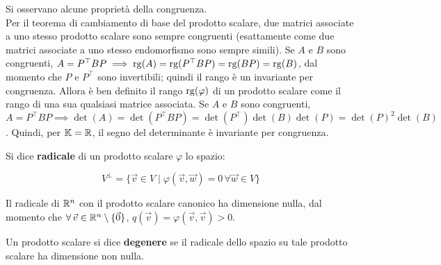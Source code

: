 \begin{remark}
	Si osservano alcune proprietà della congruenza. \\
	
	\li Per il teorema di cambiamento di base del prodotto scalare, due matrici associate a uno stesso
	prodotto scalare sono sempre congruenti (esattamente come due matrici associate a uno stesso
	endomorfismo sono sempre simili).
	\li Se $A$ e $B$ sono congruenti, $A = P^\top B P \implies \operatorname{rg}(A) = \operatorname{rg}(P^\top B P) = \operatorname{rg}(BP) = \operatorname{rg}(B)$,
	dal momento che $P$ e $P^\top$ sono invertibili; quindi il rango è un invariante per congruenza. Allora
	è ben definito il rango $\operatorname{rg}(\varphi)$ di un prodotto scalare come il rango di una sua qualsiasi matrice
	associata.
	\li Se $A$ e $B$ sono congruenti, $A = P^\top B P \implies \det(A) = \det(P^\top B P) = \det(P^\top) \det(B) \det(P)=
	\det(P)^2 \det(B)$. Quindi, per $\mathbb{K} = \mathbb R$, il segno del determinante è invariante per congruenza.
\end{remark}

\begin{definition}
	Si dice \textbf{radicale} di un prodotto scalare $\varphi$ lo spazio:
	
	\[ V^\perp = \{ \vec{v} \in V \mid \varphi(\vec{v}, \vec{w}) = 0 \, \forall \vec{w} \in V \} \]
	
	\vskip 0.05in
\end{definition}

\begin{remark}
	Il radicale di $\mathbb R^n$ con il prodotto scalare canonico ha dimensione nulla, dal momento che $\forall \vec{v} \in \RR^n \setminus \{\vec{0}\}$, $q(\vec{v}) = \varphi(\vec{v}, \vec{v}) > 0$.
\end{remark}

\begin{definition}
	Un prodotto scalare si dice \textbf{degenere} se il radicale dello spazio su tale prodotto scalare ha
	dimensione non nulla.
\end{definition}


